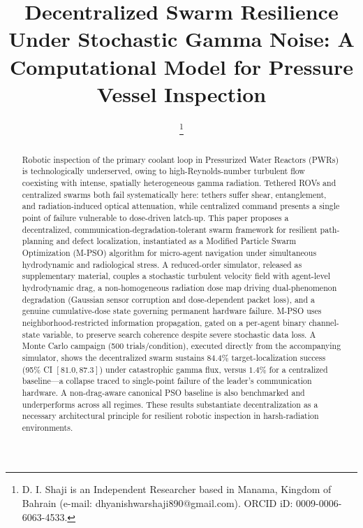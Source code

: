 \documentclass[conference]{IEEEtran}
\begin{document}
\title{Decentralized Swarm Resilience Under Stochastic Gamma Noise: A Computational Model for Pressure Vessel Inspection}

\author{
\thanks{D. I. Shaji is an Independent Researcher based in Manama, Kingdom of Bahrain (e-mail: dhyanishwarshaji890@gmail.com). ORCID iD: 0009-0006-6063-4533.}
}
\maketitle

\begin{abstract}
Robotic inspection of the primary coolant loop in Pressurized Water Reactors (PWRs) is technologically underserved, owing to high-Reynolds-number turbulent flow coexisting with intense, spatially heterogeneous gamma radiation. Tethered ROVs and centralized swarms both fail systematically here: tethers suffer shear, entanglement, and radiation-induced optical attenuation, while centralized command presents a single point of failure vulnerable to dose-driven latch-up. This paper proposes a decentralized, communication-degradation-tolerant swarm framework for resilient path-planning and defect localization, instantiated as a Modified Particle Swarm Optimization (M-PSO) algorithm for micro-agent navigation under simultaneous hydrodynamic and radiological stress. A reduced-order simulator, released as supplementary material, couples a stochastic turbulent velocity field with agent-level hydrodynamic drag, a non-homogeneous radiation dose map driving dual-phenomenon degradation (Gaussian sensor corruption and dose-dependent packet loss), and a genuine cumulative-dose state governing permanent hardware failure. M-PSO uses neighborhood-restricted information propagation, gated on a per-agent binary channel-state variable, to preserve search coherence despite severe stochastic data loss. A Monte Carlo campaign (500 trials/condition), executed directly from the accompanying simulator, shows the decentralized swarm sustains $84.4\%$ target-localization success (95\% CI $[81.0,87.3]$) under catastrophic gamma flux, versus $1.4\%$ for a centralized baseline---a collapse traced to single-point failure of the leader's communication hardware. A non-drag-aware canonical PSO baseline is also benchmarked and underperforms across all regimes. These results substantiate decentralization as a necessary architectural principle for resilient robotic inspection in harsh-radiation environments.
\end{abstract}
\end{document}
